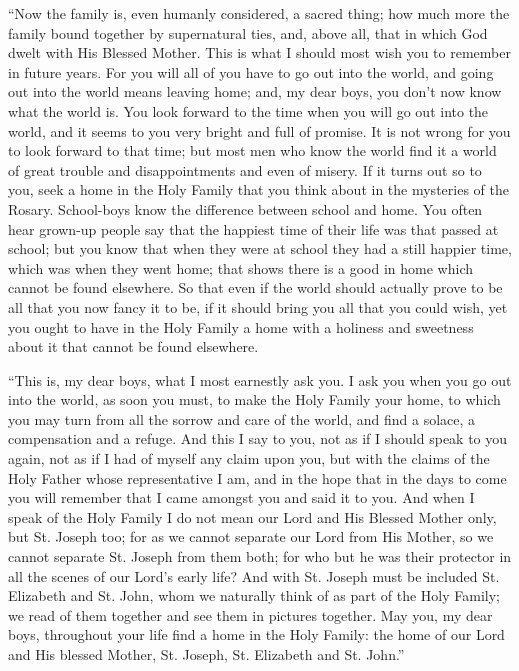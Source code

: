 ``Now the family is, even humanly considered, a sacred thing;
how much more the family bound together by supernatural ties, and,
above all, that in which God dwelt with His Blessed Mother. This is
what I should most wish you to remember in future years. For you will
all of you have to go out into the world, and going out into the world
means leaving home; and, my dear boys, you don't now know what the
world is. You look forward to the time when you will go out into the
world, and it seems to you very bright and full of promise. It is not
wrong for you to look forward to that time; but most men who know the
world find it a world of great trouble and disappointments and even of
misery. If it turns out so to you, seek a home in the Holy Family that
you think about in the mysteries of the Rosary. School-boys know the
difference between school and home. You often hear grown-up people say
that the happiest time of their life was that passed at school; but
you know that when they were at school they had a still happier time,
which was when they went home; that shows there is a good in home
which cannot be found elsewhere. So that even if the world should
actually prove to be all that you now fancy it to be, if it should
bring you all that you could wish, yet you ought to have in the Holy
Family a home with a holiness and sweetness
about it that cannot be found elsewhere.

``This is, my dear boys, what I most earnestly ask you. I ask
you when you go out into the world, as soon you must, to make the Holy
Family your home, to which you may turn from all the sorrow and care
of the world, and find a solace, a compensation and a refuge. And this
I say to you, not as if I should speak to you again, not as if I had
of myself any claim upon you, but with the claims of the Holy Father
whose representative I am, and in the hope that in the days to come
you will remember that I came amongst you and said it to you. And when
I speak of the Holy Family I do not mean our Lord and His Blessed
Mother only, but St. Joseph too; for as we cannot separate our Lord
from His Mother, so we cannot separate St. Joseph from them both; for
who but he was their protector in all the scenes of our Lord's early
life? And with St. Joseph must be included St. Elizabeth and St. John,
whom we naturally think of as part of the Holy Family; we read of them
together and see them in pictures together. May you, my dear boys,
throughout your life find a home in the Holy Family: the home of our
Lord and His blessed Mother, St. Joseph, St. Elizabeth and St.
John.''

